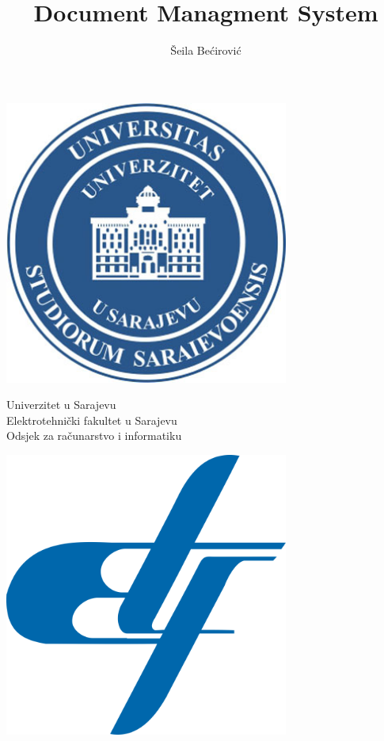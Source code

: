 \documentclass[12pt, a4paper]{report}
\title{Document Managment System}
\author{Šeila Bećirović}
\theoremstyle{definition}
\begin{document}
\begin{titlepage}
	\newcommand{\HRule}{\rule{\linewidth}{0.55mm}} 
	\noindent
	{\large
		\begin{minipage}{0.2\textwidth}
			\begin{center} 
				\includegraphics[width=0.7\textwidth]{unsa.jpg}
			\end{center}
		\end{minipage}
		\begin{minipage}{0.58\textwidth}
			\begin{center} \large
				Univerzitet u Sarajevu\\
				Elektrotehnički fakultet u Sarajevu\\
				Odsjek za računarstvo i informatiku\\
			\end{center}
		\end{minipage}
		\begin{minipage}{0.2\textwidth}
			\begin{center} 
				\includegraphics[width=0.7\textwidth]{ETF_logo.png}
			\end{center}
		\end{minipage}
		\\[5 cm] 
		
}
\end{titlepage}
\end{document}

